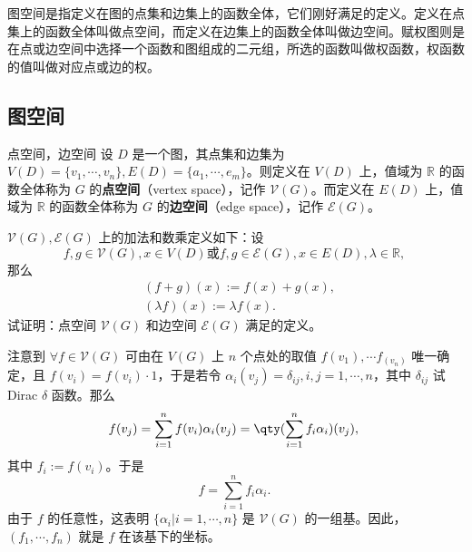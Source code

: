
图空间是指定义在图的点集和边集上的函数全体，它们刚好满足的定义。定义在点集上的函数全体叫做点空间，而定义在边集上的函数全体叫做边空间。赋权图则是在点或边空间中选择一个函数和图组成的二元组，所选的函数叫做权函数，权函数的值叫做对应点或边的权。

\subsection{图空间}
\begin{definition}{点空间，边空间}
设 $D$ 是一个图，其点集和边集为 $V(D)=\{v_1,\cdots,v_n\},E(D)=\{a_1,\cdots,e_m\}$。则定义在 $V(D)$ 上，值域为 $\mathbb R$ 的函数全体称为 $G$ 的\textbf{点空间}（vertex space），记作 $\mathcal V(G)$。而定义在 $E(D)$ 上，值域为 $\mathbb R$ 的函数全体称为 $G$ 的\textbf{边空间}（edge space），记作 $\mathcal E(G)$。
\end{definition}


\begin{exercise}{}
 $\mathcal V(G),\mathcal E(G)$ 上的加法和数乘定义如下：设
\begin{equation}
f,g\in\mathcal V(G),x\in V(D)\text{或} f,g\in\mathcal E(G),x\in E(D),\lambda\in \mathbb R,~
\end{equation}
那么
\begin{equation}
\begin{aligned}
&(f+g)(x):=f(x)+g(x),\\
&(\lambda f)(x):=\lambda f(x).
\end{aligned}~
\end{equation}
试证明：点空间 $\mathcal V(G)$ 和边空间 $\mathcal E(G)$ 满足的定义。
\end{exercise}

注意到 $\forall f\in\mathcal V(G)$ 可由在 $V(G)$ 上 $n$ 个点处的取值 $f(v_1),\cdots f_(v_n)$ 唯一确定，且 $f(v_i)=f(v_i)\cdot 1$，于是若令 $\alpha_i(v_j)=\delta_{ij},i,j=1,\cdots,n$，其中 $\delta_{ij}$ 试Dirac $\delta$ 函数。那么
\begin{equation}
f(v_j)=\sum_{i=1}^n f(v_i)\alpha_i(v_j)=\qty(\sum_{i=1}^n f_i\alpha_i)(v_j),~
\end{equation}
其中 $f_i:=f(v_i)$。于是
\begin{equation}
f=\sum_{i=1}^n f_i\alpha_i.~
\end{equation}
由于 $f$ 的任意性，这表明 $\{\alpha_i|i=1,\cdots,n\}$ 是 $\mathcal V(G)$ 的一组基。因此，$(f_1,\cdots,f_n)$ 就是 $f$ 在该基下的坐标。

